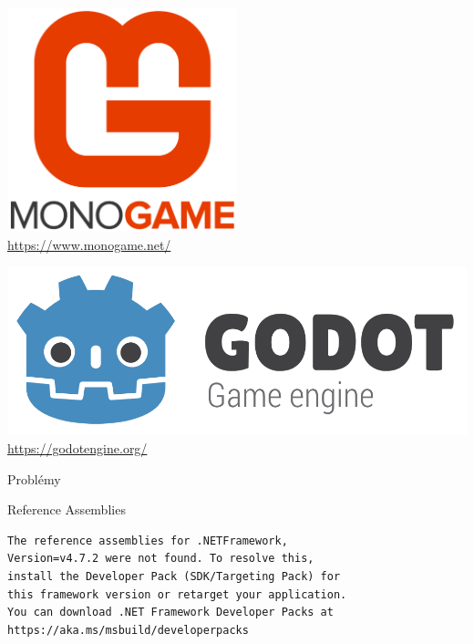 \documentclass[utf8x]{beamer}
\begin{document}
\begin{frame}
    \centering
    \includegraphics[width=0.5\textwidth]{monogame.png}
    \\
    \tiny\url{https://www.monogame.net/}
\end{frame}

\begin{frame}
    \centering
    \includegraphics[width=\textwidth]{godot.png}
    \tiny\url{https://godotengine.org/}
\end{frame}


\begin{frame}
    \begin{center}
        \color{vulkan}
        \Huge \textrm{Problémy}
    \end{center}
\end{frame}

\begin{frame}
    \begin{center}
        \LARGE \textrm{Reference Assemblies}
    \end{center}
\end{frame}

\begin{frame}[fragile]
\begin{center}
\begin{verbatim}
The reference assemblies for .NETFramework,
Version=v4.7.2 were not found. To resolve this,
install the Developer Pack (SDK/Targeting Pack) for
this framework version or retarget your application.
You can download .NET Framework Developer Packs at
https://aka.ms/msbuild/developerpacks
\end{verbatim}
\end{center}
\end{frame}
\end{document}
